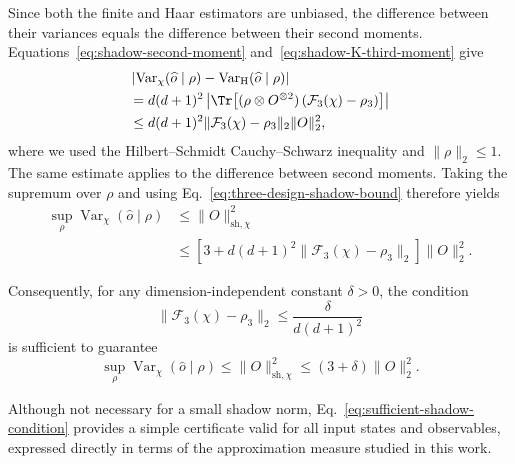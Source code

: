 \documentclass[aps,twocolumn,pra,superscriptaddress,nofootinbib]{revtex4-2}
\begin{document}
{Since both the finite and Haar estimators are unbiased, the difference between their variances equals the difference between their second moments. Equations~\eqref{eq:shadow-second-moment} and~\eqref{eq:shadow-K-third-moment} give
\begin{align}
    &\left|
        \operatorname{Var}_{\chi}(\widehat{o}\mid\rho)
        -
        \operatorname{Var}_{\mathrm H}(\widehat{o}\mid\rho)
    \right|
    \nonumber\\
    &=
    d(d+1)^{2}
    \left|
        \Tr\!\left[
            (\rho\otimes O^{\otimes 2})
            \left(
                \mathcal{F}_{3}(\chi)-\rho_{3}
            \right)
        \right]
    \right|
    \nonumber\\
    &\leq
    d(d+1)^{2}
    \|\mathcal{F}_{3}(\chi)-\rho_{3}\|_{2}
    \|O\|_{2}^{2},
    \label{eq:approximate-shadow-variance-difference}
\end{align}
where we used the Hilbert--Schmidt Cauchy--Schwarz inequality and $\|\rho\|_{2}\leq 1$. The same estimate applies to the difference between second moments. Taking the supremum over $\rho$ and using Eq.~\eqref{eq:three-design-shadow-bound} therefore yields
\begin{align}
    \sup_{\rho}
    \operatorname{Var}_{\chi}(\widehat{o}\mid\rho)
    &\leq
    \|O\|_{\mathrm{sh},\chi}^{2}
    \nonumber\\
    &\leq
    \left[
        3+
        d(d+1)^{2}
        \|\mathcal{F}_{3}(\chi)-\rho_{3}\|_{2}
    \right]
    \|O\|_{2}^{2}.
    \label{eq:approximate-shadow-variance-bound}
\end{align}

Consequently, for any dimension-independent constant $\delta>0$, the condition
\begin{equation}
    \|\mathcal{F}_{3}(\chi)-\rho_{3}\|_{2}
    \leq
    \frac{\delta}{d(d+1)^{2}}
    \label{eq:sufficient-shadow-condition}
\end{equation}
is sufficient to guarantee
\begin{equation}
    \sup_{\rho}
    \operatorname{Var}_{\chi}(\widehat{o}\mid\rho)
    \leq
    \|O\|_{\mathrm{sh},\chi}^{2}
    \leq
    (3+\delta)\|O\|_{2}^{2}.
\end{equation}

Although not necessary for a small shadow norm, Eq.~\eqref{eq:sufficient-shadow-condition} provides a simple certificate valid for all input states and observables, expressed directly in terms of the approximation measure studied in this work.

}
\end{document}
